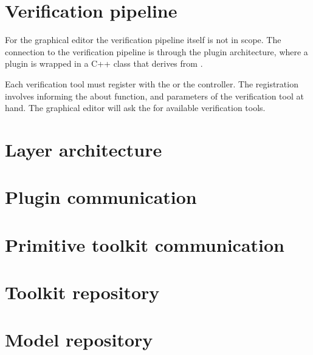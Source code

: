 \section{Verification pipeline}

For the graphical editor the verification pipeline itself is
not in scope. The connection to the verification pipeline is through
the plugin architecture, where a plugin is wrapped in a C++ class
that derives from .

Each verification tool must register with the  or 
the controller. The registration involves informing the
 about function, and parameters of the 
verification tool at hand. The graphical editor will ask the 
 for available verification tools.


\section{Layer architecture}

\section{Plugin communication}

\section{Primitive toolkit communication}

\section{Toolkit repository}

\section{Model repository}
